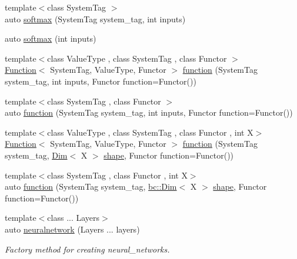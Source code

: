 \begin{DoxyCompactItemize}
\item 
{\footnotesize template$<$class System\+Tag $>$ }\\auto \hyperlink{namespacebc_1_1nn_a59289071157643a5f945692daec05a95}{softmax} (System\+Tag system\+\_\+tag, int inputs)
\item 
auto \hyperlink{namespacebc_1_1nn_a2c4469fa8ee39e64ffc2e0d5f1d6d0a6}{softmax} (int inputs)
\item 
{\footnotesize template$<$class Value\+Type , class System\+Tag , class Functor $>$ }\\\hyperlink{structbc_1_1nn_1_1Function}{Function}$<$ System\+Tag, Value\+Type, Functor $>$ \hyperlink{namespacebc_1_1nn_a0fef36d0002a6d7c7cb619d7e27d5c1e}{function} (System\+Tag system\+\_\+tag, int inputs, Functor function=Functor())
\item 
{\footnotesize template$<$class System\+Tag , class Functor $>$ }\\auto \hyperlink{namespacebc_1_1nn_a276a5ca53a08ea4d75b06e49c29ba08b}{function} (System\+Tag system\+\_\+tag, int inputs, Functor function=Functor())
\item 
{\footnotesize template$<$class Value\+Type , class System\+Tag , class Functor , int X$>$ }\\\hyperlink{structbc_1_1nn_1_1Function}{Function}$<$ System\+Tag, Value\+Type, Functor $>$ \hyperlink{namespacebc_1_1nn_a096e40e3a123e5596200426da91ec617}{function} (System\+Tag system\+\_\+tag, \hyperlink{structbc_1_1Dim}{Dim}$<$ X $>$ \hyperlink{namespacebc_a1bc6dec532973ac024c738c0fd32cca3}{shape}, Functor function=Functor())
\item 
{\footnotesize template$<$class System\+Tag , class Functor , int X$>$ }\\auto \hyperlink{namespacebc_1_1nn_a8d19df0b93be99f409be6e2a65ca1052}{function} (System\+Tag system\+\_\+tag, \hyperlink{structbc_1_1Dim}{bc\+::\+Dim}$<$ X $>$ \hyperlink{namespacebc_a1bc6dec532973ac024c738c0fd32cca3}{shape}, Functor function=Functor())
\item 
{\footnotesize template$<$class ... Layers$>$ }\\auto \hyperlink{namespacebc_1_1nn_aed1958e9d71be2ebdf0c51c26e97b947}{neuralnetwork} (Layers ... layers)
\begin{DoxyCompactList}\small\item\em Factory method for creating neural\+\_\+networks. \end{DoxyCompactList}\end{DoxyCompactItemize}
